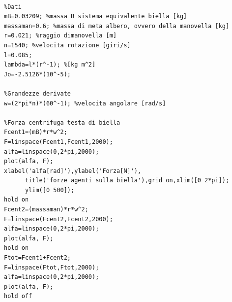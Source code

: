 \begin{lstlisting}[frame=trBL]
%Calcolo forze su biella

%Dati
mB=0.03209; %massa B sistema equivalente biella [kg]
massaman=0.6; %massa di meta albero, ovvero della manovella [kg]
r=0.021; %raggio dimanovella [m]
n=1540; %velocita rotazione [giri/s]
l=0.085;
lambda=l*(r^-1); %[kg m^2]
Jo=-2.5126*(10^-5);

%Grandezze derivate
w=(2*pi*n)*(60^-1); %velocita angolare [rad/s]

%Forza centrifuga testa di biella
Fcent1=(mB)*r*w^2;
F=linspace(Fcent1,Fcent1,2000);
alfa=linspace(0,2*pi,2000);
plot(alfa, F);
xlabel('alfa[rad]'),ylabel('Forza[N]'),
      title('forze agenti sulla biella'),grid on,xlim([0 2*pi]);
      ylim([0 500]);
hold on
Fcent2=(massaman)*r*w^2;
F=linspace(Fcent2,Fcent2,2000);
alfa=linspace(0,2*pi,2000);
plot(alfa, F);
hold on
Ftot=Fcent1+Fcent2;
F=linspace(Ftot,Ftot,2000);
alfa=linspace(0,2*pi,2000);
plot(alfa, F);
hold off
\end{lstlisting}

